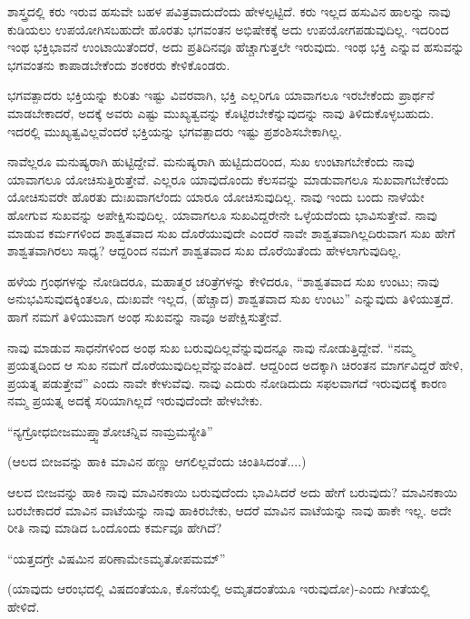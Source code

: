 ಶಾಸ್ತ್ರದಲ್ಲಿ ಕರು ಇರುವ ಹಸುವೇ ಬಹಳ ಪವಿತ್ರವಾದುದೆಂದು ಹೇಳಲ್ಪಟ್ಟಿದೆ. ಕರು ಇಲ್ಲದ ಹಸುವಿನ ಹಾಲನ್ನು ನಾವು ಕುಡಿಯಲು ಉಪಯೋಗಿಸಬಹುದೇ ಹೊರತು ಭಗವಂತನ ಅಭಿಷೇಕಕ್ಕೆ ಅದು ಉಪಯೋಗಪಡುವುದಿಲ್ಲ. ಇದರಿಂದ ಇಂಥ ಭಕ್ತಿಭಾವನೆ ಉಂಟಾಯಿತೆಂದರೆ, ಅದು ಪ್ರತಿದಿನವೂ ಹೆಚ್ಚಾಗುತ್ತಲೇ ಇರುವುದು. ಇಂಥ ಭಕ್ತಿ ಎನ್ನುವ ಹಸುವನ್ನು ಭಗವಂತನು ಕಾಪಾಡಬೇಕೆಂದು ಶಂಕರರು ಕೇಳಿಕೊಂಡರು.

ಭಗವತ್ಪಾದರು ಭಕ್ತಿಯನ್ನು ಕುರಿತು ಇಷ್ಟು ವಿವರವಾಗಿ, ಭಕ್ತಿ ಎಲ್ಲರಿಗೂ ಯಾವಾಗಲೂ ಇರಬೇಕೆಂದು ಪ್ರಾರ್ಥನೆ ಮಾಡಬೇಕಾದರೆ, ಅದಕ್ಕೆ ಅವರು ಎಷ್ಟು ಮುಖ್ಯತ್ವವನ್ನು ಕೊಟ್ಟಿರಬೇಕೆನ್ನುವುದನ್ನು ನಾವು ತಿಳಿದುಕೊಳ್ಳಬಹುದು. ಇದರಲ್ಲಿ ಮುಖ್ಯತ್ವವಿಲ್ಲವೆಂದರೆ ಭಕ್ತಿಯನ್ನು ಭಗವತ್ಪಾದರು ಇಷ್ಟು ಪ್ರಶಂಶಿಸಬೇಕಾಗಿಲ್ಲ.

ನಾವೆಲ್ಲರೂ ಮನುಷ್ಯರಾಗಿ ಹುಟ್ಟಿದ್ದೇವೆ. ಮನುಷ್ಯರಾಗಿ ಹುಟ್ಟಿದುದರಿಂದ, ಸುಖ ಉಂಟಾಗಬೇಕೆಂದು ನಾವು ಯಾವಾಗಲೂ ಯೋಚಿಸುತ್ತಿರುತ್ತೇವೆ. ಎಲ್ಲರೂ ಯಾವುದೊಂದು ಕೆಲಸವನ್ನು ಮಾಡುವಾಗಲೂ ಸುಖವಾಗಬೇಕೆಂದು ಯೋಚಿಸುವರೇ ಹೊರತು ದುಃಖವಾಗಲೆಂದು ಯಾರೂ ಯೋಚಿಸುವುದಿಲ್ಲ. ನಾವು ಇಂದು ಬಂದು ನಾಳೆಯೇ ಹೋಗುವ ಸುಖವನ್ನು ಅಪೇಕ್ಷಿಸುವುದಿಲ್ಲ. ಯಾವಾಗಲೂ ಸುಖವಿದ್ದರೇನೇ ಒಳ್ಳೆಯದೆಂದು ಭಾವಿಸುತ್ತೇವೆ. ನಾವು ಮಾಡುವ ಕರ್ಮಗಳಿಂದ ಶಾಶ್ವತವಾದ ಸುಖ ದೊರೆಯುವುದೇ ಎಂದರೆ ನಾವೇ ಶಾಶ್ವತವಾಗಿಲ್ಲದಿರುವಾಗ ಸುಖ ಹೇಗೆ ಶಾಶ್ವತವಾಗಿರಲು ಸಾಧ್ಯ? ಆದ್ದರಿಂದ ನಮಗೆ ಶಾಶ್ವತವಾದ ಸುಖ ದೊರೆಯಿತೆಂದು ಹೇಳಲಾಗುವುದಿಲ್ಲ.

ಹಳೆಯ ಗ್ರಂಥಗಳನ್ನು ನೋಡಿದರೂ, ಮಹಾತ್ಮರ ಚರಿತ್ರೆಗಳನ್ನು ಕೇಳಿದರೂ, ``ಶಾಶ್ವತವಾದ ಸುಖ ಉಂಟು; ನಾವು ಅನುಭವಿಸುವುದಕ್ಕಿಂತಲೂ, ದುಃಖವೇ ಇಲ್ಲದ, (ಹೆಚ್ಚಾದ) ಶಾಶ್ವತವಾದ ಸುಖ ಉಂಟು'' ಎನ್ನುವುದು ತಿಳಿಯುತ್ತದೆ. ಹಾಗೆ ನಮಗೆ ತಿಳಿಯುವಾಗ ಅಂಥ ಸುಖವನ್ನು ನಾವೂ ಅಪೇಕ್ಷಿಸುತ್ತೇವೆ.

ನಾವು ಮಾಡುವ ಸಾಧನೆಗಳಿಂದ ಅಂಥ ಸುಖ ಬರುವುದಿಲ್ಲವೆನ್ನುವುದನ್ನೂ ನಾವು ನೋಡುತ್ತಿದ್ದೇವೆ. ``ನಮ್ಮ ಪ್ರಯತ್ನದಿಂದ ಆ ಸುಖ ನಮಗೆ ದೊರೆಯುವುದಿಲ್ಲವೆನ್ನುವಂತಿದೆ. ಆದ್ದರಿಂದ ಅದಕ್ಕಾಗಿ ಚಿರಂತನ ಮಾರ್ಗವಿದ್ದರೆ ಹೇಳಿ, ಪ್ರಯತ್ನ ಪಡುತ್ತೇವೆ'' ಎಂದು ನಾವೇ ಕೇಳುವೆವು. ನಾವು ಎದುರು ನೋಡಿದುದು ಸಫಲವಾಗದೆ ಇರುವುದಕ್ಕೆ ಕಾರಣ ನಮ್ಮ ಪ್ರಯತ್ನ ಅದಕ್ಕೆ ಸರಿಯಾಗಿಲ್ಲದೆ ಇರುವುದೆಂದೇ ಹೇಳಬೇಕು.

\begin{shloka}
``ನ್ಯಗ್ರೋಧಬೀಜಮುಪ್ತ್ವಾಶೋಚನ್ನಿವ ನಾಮ್ರಮಸ್ಯೇತಿ''
\end{shloka}

(ಆಲದ ಬೀಜವನ್ನು ಹಾಕಿ ಮಾವಿನ ಹಣ್ಣು ಆಗಲಿಲ್ಲವೆಂದು ಚಿಂತಿಸಿದಂತೆ....)

ಆಲದ ಬೀಜವನ್ನು ಹಾಕಿ ನಾವು ಮಾವಿನಕಾಯಿ ಬರುವುದೆಂದು ಭಾವಿಸಿದರೆ ಅದು ಹೇಗೆ ಬರುವುದು? ಮಾವಿನಕಾಯಿ ಬರಬೇಕಾದರೆ ಮಾವಿನ ವಾಟೆಯನ್ನು ನಾವು ಹಾಕಿರಬೇಕು, ಆದರೆ ಮಾವಿನ ವಾಟೆಯನ್ನು ನಾವು ಹಾಕೇ ಇಲ್ಲ. ಅದೇ ರೀತಿ ನಾವು ಮಾಡಿದ ಒಂದೊಂದು ಕರ್ಮವೂ ಹೇಗಿದೆ?

\begin{shloka}
``ಯತ್ತದಗ್ರೇ ವಿಷಮಿನ ಪರಿಣಾಮೇಽಮೃತೋಪಮಮ್''
\end{shloka}

(ಯಾವುದು ಆರಂಭದಲ್ಲಿ ವಿಷದಂತೆಯೂ, ಕೊನೆಯಲ್ಲಿ ಅಮೃತದಂತೆಯೂ ಇರುವುದೋ)-ಎಂದು ಗೀತೆಯಲ್ಲಿ ಹೇಳಿದೆ.

